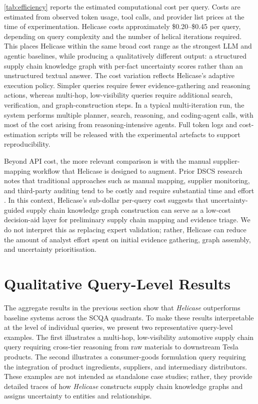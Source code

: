 \documentclass{article}
\begin{document}
\autoref{tab:efficiency} reports the estimated computational cost per query. Costs are estimated from observed token usage, tool calls, and provider list prices at the time of experimentation. Helicase costs approximately \$0.20--\$0.45 per query, depending on query complexity and the number of helical iterations required. This places Helicase within the same broad cost range as the strongest LLM and agentic baselines, while producing a qualitatively different output: a structured supply chain knowledge graph with per-fact uncertainty scores rather than an unstructured textual answer.
The cost variation reflects Helicase's adaptive execution policy. Simpler queries require fewer evidence-gathering and reasoning actions, whereas multi-hop, low-visibility queries require additional search, verification, and graph-construction steps. In a typical multi-iteration run, the system performs multiple planner, search, reasoning, and coding-agent calls, with most of the cost arising from reasoning-intensive agents. Full token logs and cost-estimation scripts will be released with the experimental artefacts to support reproducibility.

Beyond API cost, the more relevant comparison is with the manual supplier-mapping workflow that Helicase is designed to augment. Prior DSCS research notes that traditional approaches such as manual mapping, supplier monitoring, and third-party auditing tend to be costly and require substantial time and effort \citep{brintrup2024digital}. In this context, Helicase's sub-dollar per-query cost suggests that uncertainty-guided supply chain knowledge graph construction can serve as a low-cost decision-aid layer for preliminary supply chain mapping and evidence triage. We do not interpret this as replacing expert validation; rather, Helicase can reduce the amount of analyst effort spent on initial evidence gathering, graph assembly, and uncertainty prioritisation.
\section{Qualitative Query-Level Results}
\label{sec:qualitative-results}

The aggregate results in the previous section show that \textit{Helicase} outperforms baseline systems across the SCQA quadrants. To make these results interpretable at the level of individual queries, we present two representative query-level examples. The first illustrates a multi-hop, low-visibility automotive supply chain query requiring cross-tier reasoning from raw materials to downstream Tesla products. The second illustrates a consumer-goods formulation query requiring the integration of product ingredients, suppliers, and intermediary distributors. These examples are not intended as standalone case studies; rather, they provide detailed traces of how \textit{Helicase} constructs supply chain knowledge graphs and assigns uncertainty to entities and relationships.
\end{document}

